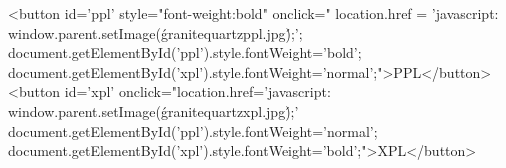 <button id='ppl' style="font-weight:bold" onclick="
  location.href = 'javascript: window.parent.setImage(\'granitequartzppl.jpg\');'; 
  document.getElementById('ppl').style.fontWeight='bold';
  document.getElementById('xpl').style.fontWeight='normal';">PPL</button>
<button id='xpl' onclick="location.href='javascript: window.parent.setImage(\'granitequartzxpl.jpg\');'
  document.getElementById('ppl').style.fontWeight='normal';
  document.getElementById('xpl').style.fontWeight='bold';">XPL</button>